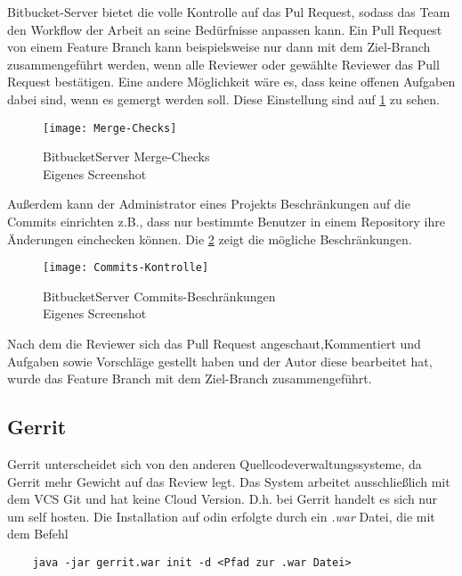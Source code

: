 Bitbucket-Server bietet die volle Kontrolle auf das Pul Request, sodass das Team den Workflow der Arbeit an seine Bedürfnisse anpassen kann. Ein Pull Request von einem Feature Branch kann beispielsweise nur dann mit dem Ziel-Branch zusammengeführt werden, wenn alle Reviewer oder gewählte Reviewer das Pull Request bestätigen. Eine andere Möglichkeit wäre es, dass keine offenen Aufgaben dabei sind, wenn es gemergt werden soll. Diese Einstellung sind auf \cref{fig:BitbucketServer Merge-Checks} zu sehen.
\begin{figure}[H]
	\centering
	\texttt{[image: Merge-Checks]}
	\caption[BitbucketServer Merge-Checks]{BitbucketServer Merge-Checks\\Eigenes Screenshot}
	\label{fig:BitbucketServer Merge-Checks}
\end{figure}

Außerdem kann der Administrator eines Projekts Beschränkungen auf die Commits einrichten z.B., dass nur bestimmte Benutzer in einem Repository ihre Änderungen einchecken können. Die \cref{fig:BitbucketServer Commits-Kontrolle} zeigt die mögliche Beschränkungen.

\begin{figure}[H]
	\centering
	\texttt{[image: Commits-Kontrolle]}
	\caption[BitbucketServer Commits-Beschränkungen]{BitbucketServer Commits-Beschränkungen\\Eigenes Screenshot}
	\label{fig:BitbucketServer Commits-Kontrolle}
\end{figure}

Nach dem die Reviewer sich das Pull Request angeschaut,Kommentiert und Aufgaben sowie Vorschläge gestellt haben und der Autor diese bearbeitet hat, wurde das Feature Branch mit dem Ziel-Branch zusammengeführt.

\subsection{Gerrit}
\label{subsubsec:Test_Gerrit}

Gerrit unterscheidet sich von den anderen Quellcodeverwaltungssysteme, da Gerrit mehr Gewicht auf das Review legt. Das System arbeitet ausschließlich mit dem \ac{VCS} Git und hat keine Cloud Version. D.h. bei Gerrit handelt es sich nur um self hosten. Die Installation auf odin erfolgte durch ein \textit{.war} Datei, die mit dem Befehl

{\color{blue}
\begin{verbatim}
	java -jar gerrit.war init -d <Pfad zur .war Datei> 
\end{verbatim}}

